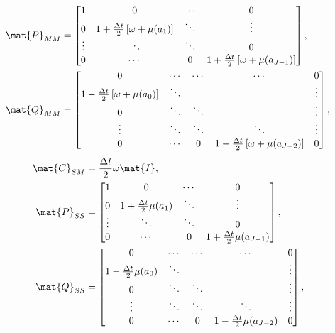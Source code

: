\documentclass{jpmarticle}
\begin{document}
\begin{equation}
  \begin{split}
    \mat{P}_{MM} &=
    \begin{bmatrix}
      1 & 0 & \cdots & 0
      \\
      0 & 1 + \frac{\Delta t}{2} \left[\omega + \mu(a_1)\right] &
      \ddots & \vdots
      \\
      \vdots & \ddots & \ddots & 0
      \\
      0 & \cdots & 0 &
      1 + \frac{\Delta t}{2} \left[\omega + \mu(a_{J - 1})\right]
    \end{bmatrix},
    \\
    \mat{Q}_{MM} &=
    \begin{bmatrix}
      0 & \cdots & \cdots & \cdots & 0
      \\
      1 - \frac{\Delta t}{2} \left[\omega + \mu(a_0)\right] & \ddots &
      & & \vdots
      \\
      0 & \ddots & \ddots & & \vdots
      \\
      \vdots & \ddots & \ddots & \ddots & \vdots
      \\
      0 & \cdots & 0 &
      1 - \frac{\Delta t}{2} \left[\omega + \mu(a_{J - 2})\right] & 0
    \end{bmatrix},
  \end{split}
\end{equation}
\begin{equation}
  \begin{split}
    \mat{C}_{SM} &=
    \frac{\Delta t}{2} \omega \mat{I},
    \\
    \mat{P}_{SS} &=
    \begin{bmatrix}
      1 & 0 & \cdots & 0
      \\
      0 & 1 + \frac{\Delta t}{2} \mu(a_1) &
      \ddots & \vdots
      \\
      \vdots & \ddots & \ddots & 0
      \\
      0 & \cdots & 0 &
      1 + \frac{\Delta t}{2} \mu(a_{J - 1})
    \end{bmatrix},
    \\
    \mat{Q}_{SS} &=
    \begin{bmatrix}
      0 & \cdots & \cdots & \cdots & 0
      \\
      1 - \frac{\Delta t}{2} \mu(a_0) & \ddots &
      & & \vdots
      \\
      0 & \ddots & \ddots & & \vdots
      \\
      \vdots & \ddots & \ddots & \ddots & \vdots
      \\
      0 & \cdots & 0 &
      1 - \frac{\Delta t}{2} \mu(a_{J - 2}) & 0
    \end{bmatrix},
  \end{split}
\end{equation}
\end{document}
